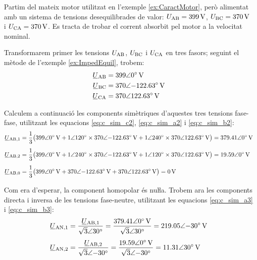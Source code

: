 \begin{exemple}\label{ex:TensDeseqMotor}
	\addcontentsxms{\TensDeseqMotor}
	Partim del mateix motor utilitzat en l'exemple \vref{ex:CaractMotor}, però alimentat amb un sistema de tensions desequilibrades de valor: $U_\mathrm{AB} =
	\qty{399}{V}$, $U_\mathrm{BC} = \qty{370}{V}$ i
	$U_\mathrm{CA} = \qty{370}{V}$. Es tracta de trobar el corrent absorbit pel motor a la velocitat nominal.
	
	Transformarem primer les tensions $U_\mathrm{AB}$, $U_\mathrm{BC}$ i $U_\mathrm{CA}$ en tres fasors; seguint el mètode de l'exemple \vref{ex:ImpedEquil}, trobem:
	\begin{align*}
		\cmplx{U}\ped{AB} &= \complexqty{399:0}{V} \\
		\cmplx{U}\ped{BC} &= \complexqty{370:-122,63}{V} \\
		\cmplx{U}\ped{CA} &= \complexqty{370:122,63}{V}
	\end{align*}
	
	Calculem a continuació les components simètriques d'aquestes tres tensions fase-fase, utilitzant les equacions
	\eqref{eq:c_sim_c2}, \eqref{eq:c_sim_a2} i \eqref{eq:c_sim_b2}:
	\begin{align*}
	\cmplx{U}\ped{AB,1} &= \frac{1}{3} \big(
	\complexqty{399:0}{V} + \complexnum{1:120} \times \complexqty{370:-122,63}{V} +
	\complexnum{1:240} \times \complexqty{370:122,63}{V}\big) = \complexqty{379,41:0}{V} \\[1ex]
	\cmplx{U}\ped{AB,2} &= \frac{1}{3} \big(
	\complexqty{399:0}{V} + \complexnum{1:240} \times \complexqty{370:-122,63}{V} +
	\complexnum{1:120} \times \complexqty{370:122,63}{V} \big) = \complexqty{19,59:0}{V} \\[1ex]
	\cmplx{U}\ped{AB,0} &= \frac{1}{3} \big(
	\complexqty{399:0}{V} + \complexqty{370:-122,63}{V} + \complexqty{370:122,63}{V}\big) = \qty{0}{V}
	\end{align*}
	
	Com era d'esperar, la component homopolar és nuŀla.	 Trobem ara les components directa i inversa
	de les tensions fase-neutre, utilitzant les equacions
	\eqref{eq:c_sim_a3} i \eqref{eq:c_sim_b3}:
	\begin{align*}
	\cmplx{U}\ped{AN,1} &=
	\frac{\cmplx{U}\ped{AB,1}}{\complexnum[parse-numbers=false]{\sqrt{3}:30}} =
	\frac{\complexqty{379,41:0}{V}}{\complexnum[parse-numbers=false]{\sqrt{3}:30}} =
	\complexqty{219,05:-30}{V} \\[1ex]
	\cmplx{U}\ped{AN,2} &=
	\frac{\cmplx{U}\ped{AB,2}}{\complexnum[parse-numbers=false]{\sqrt{3}:-30}} =
	\frac{\complexqty{19,59:0}{V}}{\complexnum[parse-numbers=false]{\sqrt{3}:-30}} =
	\complexqty{11,31:30}{V} 
	\end{align*}
	

\end{exemple}
